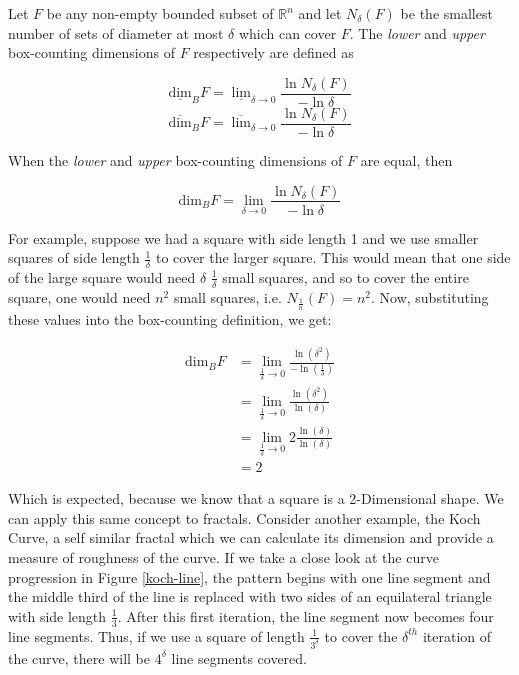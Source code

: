 \documentclass[a4paper,11pt,twoside]{article}
\begin{document}
Let \(F\) be any non-empty bounded subset of \(\mathbb{R}^n\) and let \(N_\delta(F)\) be the smallest
number of sets of diameter at most \(\delta\) which can cover \(F\). The \emph{lower} and \emph{upper}
box-counting dimensions of \(F\) respectively are defined as

\begin{equation*}
    \underline{\text{dim}}_BF = \underline{\lim}_{\delta \to 0} \frac{\ln N_\delta(F)}{-\ln \delta}
\end{equation*}
\begin{equation*}
\overline{\text{dim}}_BF = \overline{\lim}_{\delta \to 0} \frac{\ln N_\delta(F)}{-\ln \delta}
\end{equation*}

When the \emph{lower} and \emph{upper} box-counting dimensions of \(F\) are equal, then

\begin{equation*}
\text{dim}_BF = \lim_{\delta \to 0} \frac{\ln N_\delta(F)}{-\ln \delta}
\end{equation*}

For example, suppose we had a square with side length 1 and we use smaller squares of side
length \(\frac{1}{\delta}\) to cover the larger square. This would mean that one side of the
large square would need \(\delta\) \(\frac{1}{\delta}\) small squares, and so to cover
the entire square, one would need \(n^2\) small squares, i.e. \(N_{\frac{1}{n}}(F) = n^2\). Now,
substituting these values into the box-counting definition, we get:

\begin{align*}
\text{dim}_BF &= \lim_{\frac{1}{\delta} \to 0} \frac{\ln(\delta^2)}{-\ln(\frac{1}{\delta})}\\
&= \lim_{\frac{1}{\delta} \to 0} \frac{\ln(\delta^2)}{\ln(\delta)}\\
&= \lim_{\frac{1}{\delta} \to 0} 2\frac{\ln(\delta)}{\ln(\delta)}\\
&= 2
\end{align*}

Which is expected, because we know that a square is a 2-Dimensional shape. We
can apply this same concept to fractals. Consider another example, the Koch
Curve, a self similar fractal which we can calculate its dimension and provide a
measure of roughness of the curve. If we take a close look at the curve progression
in Figure \ref{koch-line}, the pattern begins with one line segment and the middle third
of the line is replaced with two sides of an equilateral triangle with side length
\(\frac{1}{3}\). After this first iteration, the line segment now becomes four line
segments. Thus, if we use a square of length \(\frac{1}{3^{\delta}}\) to cover the \(\delta^{th}\)
iteration of the curve, there will be \(4^{\delta}\) line segments covered.
\end{document}
